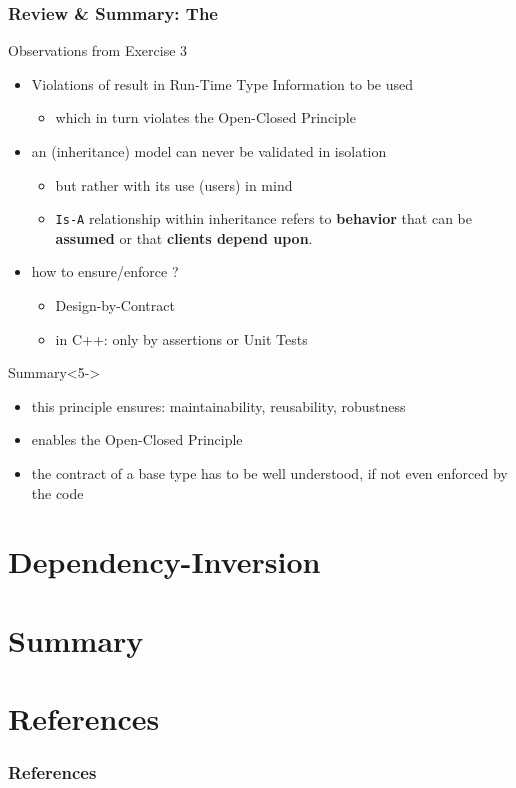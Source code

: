 \documentclass[9pt]{beamer}
\begin{document}
\begin{frame}
  \frametitle{Review \& Summary: The \secname}
  \begin{block}{Observations from Exercise 3}
    \begin{itemize}
    \item<2-> Violations of {\secname} result in Run-Time Type Information to be used
      \begin{itemize}
      \item which in turn violates the Open-Closed Principle
      \end{itemize}
    \item<3-> an (inheritance) model can never be validated in isolation 
      \begin{itemize}
      \item but rather with its use (users) in mind
      \item \texttt{Is-A} relationship within inheritance refers to \textbf{behavior} that can be \textbf{assumed} or that \textbf{clients depend upon}.
      \end{itemize}
    \item<4-> how to ensure/enforce \secname?
      \begin{itemize}
      \item Design-by-Contract 
      \item in C++: only by assertions or Unit Tests
      \end{itemize}
    \end{itemize}
  \end{block}
\pause
\vfill
\begin{block}{Summary}<5->
  \begin{itemize}
  \item this principle ensures: maintainability, reusability, robustness
  \item {\secname} enables the Open-Closed Principle
  \item the contract of a base type has to be well understood, if not even enforced by the code
  \end{itemize}
\end{block}
\end{frame}

\section{Dependency-Inversion}

\section{Summary}

\section{References}
\scriptsize
\begin{frame}
  \frametitle{References}
   
  
\end{frame}
\end{document}
